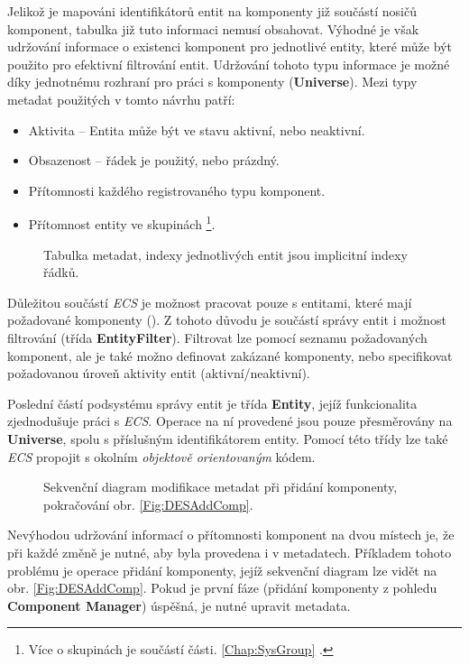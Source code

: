 Jelikož je mapováni identifikátorů entit na komponenty již součástí nosičů komponent, tabulka již tuto informaci nemusí obsahovat. Výhodné je však udržování informace o existenci komponent pro jednotlivé entity, které může být použito pro efektivní filtrování entit. Udržování tohoto typu informace je možné díky jednotnému rozhraní pro práci s komponenty (\textbf{Universe}). Mezi typy metadat použitých v tomto návrhu patří: 
\begin{itemize}
	\item Aktivita -- Entita může být ve stavu aktivní, nebo neaktivní.
	\item Obsazenost -- řádek je použitý, nebo prázdný. 
	\item Přítomnosti každého registrovaného typu komponent.
	\item Přítomnost entity ve skupinách \footnote{Více o skupinách je součástí části. \ref{Chap:SysGroup} .}.
\end{itemize}

\begin{figure}
	\caption{Tabulka metadat, indexy jednotlivých entit jsou implicitní indexy řádků.}
	\label{Fig:DESMetadata}
\end{figure}

Důležitou součástí \emph{ECS} je možnost pracovat pouze s entitami, které mají požadované komponenty (). Z tohoto důvodu je součástí správy entit i možnost filtrování (třída \textbf{EntityFilter}). Filtrovat lze pomocí seznamu požadovaných komponent, ale je také možno definovat zakázané komponenty, nebo specifikovat požadovanou úroveň aktivity entit (aktivní/neaktivní).

Poslední částí podsystému správy entit je třída \textbf{Entity}, jejíž funkcionalita zjednodušuje práci s \emph{ECS}. Operace na ní provedené jsou pouze přesměrovány na \textbf{Universe}, spolu s příslušným identifikátorem entity. Pomocí této třídy lze také \emph{ECS} propojit s okolním \emph{objektově orientovaným} kódem.

\begin{figure}[H]
	\centering
	\caption{Sekvenční diagram modifikace metadat při přidání komponenty, pokračování obr. \ref{Fig:DESAddComp}.}
	\label{Fig:DESAddEnt}
\end{figure}

Nevýhodou udržování informací o přítomnosti komponent na dvou místech je, že při každé změně je nutné, aby byla provedena i v metadatech. Příkladem tohoto problému je operace přidání komponenty, jejíž sekvenční diagram lze vidět na obr. \ref{Fig:DESAddComp}. Pokud je první fáze (přidání komponenty z pohledu \textbf{Component Manager}) úspěšná, je nutné upravit metadata.

